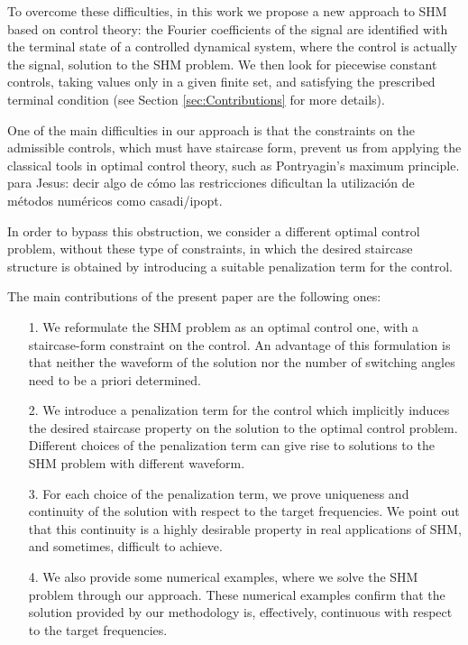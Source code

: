 \documentclass[9pt,shortpaper,twoside,web]{ieeecolor}
\begin{document}
To overcome these difficulties, in this work we propose a new approach to SHM based on control theory: the Fourier coefficients of the signal are identified with the terminal state of a controlled dynamical system, where the control is actually the signal, solution to the SHM problem. We then look for piecewise constant controls, taking values only in a given finite set, and satisfying the prescribed terminal condition (see Section \ref{sec:Contributions} for more details). 

%

One of the main difficulties in our approach is  that the constraints on the admissible controls, which must have staircase form,  prevent us from applying the classical tools in optimal control theory, such as Pontryagin's maximum principle. {\color{red} para Jesus: decir algo de cómo las restricciones dificultan la utilización de métodos numéricos como casadi/ipopt. }

In order to bypass this obstruction, we consider a different optimal control problem, without these type of constraints, in which the desired staircase structure is obtained by introducing a suitable penalization term for the control. 


The main contributions of the present paper are the following ones:
\begin{enumerate}
	\item[1.] We reformulate the SHM problem as an optimal control one, with a staircase-form constraint on the control. An advantage of this formulation is that neither the waveform of the solution nor the number of switching angles need to be a priori determined.  
	\item[2.] We introduce a penalization term for the control which implicitly induces the desired staircase property on the solution to the optimal control problem.  Different choices of the penalization term can give rise to  solutions to the SHM problem with different waveform.
	\item[3.] For each choice of the penalization term, we prove  uniqueness and continuity of the solution with respect to the target frequencies.  We point out that this continuity is a highly desirable property in real applications of SHM, and sometimes, difficult to achieve.
	\item[4.] We also provide some numerical examples, where we solve the SHM problem through our approach. These numerical examples confirm that the solution provided by our methodology is, effectively, continuous with respect to the target frequencies.
\end{enumerate}
\end{document}
